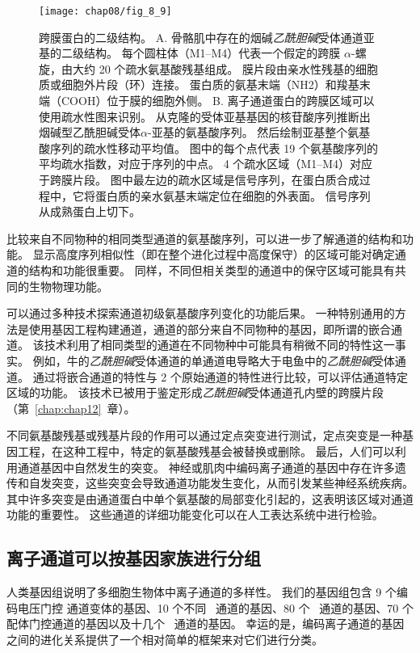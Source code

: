 \begin{figure}[htbp]
	\centering
	\texttt{[image: chap08/fig\_8\_9]}
	\caption{跨膜蛋白的二级结构。
		A. 骨骼肌中存在的烟碱\textit{乙酰胆碱}受体通道亚基的二级结构。
		每个圆柱体（M1–M4）代表一个假定的跨膜 $\alpha$-螺旋，由大约 20 个疏水氨基酸残基组成。
		膜片段由亲水性残基的细胞质或细胞外片段（环）连接。
		蛋白质的氨基末端（NH2）和羧基末端（COOH）位于膜的细胞外侧。
		B. 离子通道蛋白的跨膜区域可以使用疏水性图来识别。
		从克隆的受体亚基基因的核苷酸序列推断出烟碱型乙酰胆碱受体$\alpha$-亚基的氨基酸序列。
		然后绘制亚基整个氨基酸序列的疏水性移动平均值。
		图中的每个点代表 19 个氨基酸序列的平均疏水指数，对应于序列的中点。
		4 个疏水区域（M1–M4）对应于跨膜片段。
		图中最左边的疏水区域是信号序列，在蛋白质合成过程中，它将蛋白质的亲水氨基末端定位在细胞的外表面。
		信号序列从成熟蛋白上切下\cite{schofield1987sequence}。}
	\label{fig:8_9}
\end{figure}


比较来自不同物种的相同类型通道的氨基酸序列，可以进一步了解通道的结构和功能。
显示高度序列相似性（即在整个进化过程中高度保守）的区域可能对确定通道的结构和功能很重要。
同样，不同但相关类型的通道中的保守区域可能具有共同的生物物理功能。


可以通过多种技术探索通道初级氨基酸序列变化的功能后果。
一种特别通用的方法是使用基因工程构建通道，通道的部分来自不同物种的基因，即所谓的嵌合通道。
该技术利用了相同类型的通道在不同物种中可能具有稍微不同的特性这一事实。
例如，牛的\textit{乙酰胆碱}受体通道的单通道电导略大于电鱼中的\textit{乙酰胆碱}受体通道。
通过将嵌合通道的特性与 2 个原始通道的特性进行比较，可以评估通道特定区域的功能。
该技术已被用于鉴定形成\textit{乙酰胆碱}受体通道孔内壁的跨膜片段（第~\ref{chap:chap12}~章）。


不同氨基酸残基或残基片段的作用可以通过定点突变进行测试，定点突变是一种基因工程，在这种工程中，特定的氨基酸残基会被替换或删除。
最后，人们可以利用通道基因中自然发生的突变。
神经或肌肉中编码离子通道的基因中存在许多遗传和自发突变，这些突变会导致通道功能发生变化，从而引发某些神经系统疾病。
其中许多突变是由通道蛋白中单个氨基酸的局部变化引起的，这表明该区域对通道功能的重要性。
这些通道的详细功能变化可以在人工表达系统中进行检验。



\subsection{离子通道可以按基因家族进行分组}

人类基因组说明了多细胞生物体中离子通道的多样性。
我们的基因组包含 9 个编码电压门控  通道变体的基因、10 个不同~ 通道的基因、80 个~ 通道的基因、70 个配体门控通道的基因以及十几个~ 通道的基因。
幸运的是，编码离子通道的基因之间的进化关系提供了一个相对简单的框架来对它们进行分类。


